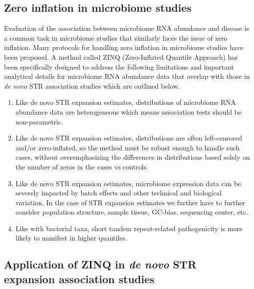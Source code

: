 \documentclass[unnumsec,webpdf,contemporary,large]{oup-authoring-template}%
\theoremstyle{thmstyleone}%
\theoremstyle{thmstyletwo}%
\theoremstyle{thmstylethree}%
\begin{document}
\subsection{Zero inflation in microbiome studies}\label{subsec1}

Evaluation of the association between microbiome RNA abundance and disease is a common task in
microbiome studies that similarly faces the issue of zero inflation. Many protocols for 
handling zero inflation in microbiome studies have been proposed. A method called ZINQ\cite{ling_powerful_2021}
(Zero-Inflated Quantile Approach) has been specifically designed to address the following limitations
and important analytical details for microbiome RNA abundance data that overlap with those in
\emph{de novo} STR association studies which are outlined below.

\begin{enumerate}
    \item Like de novo STR expansion estimates, distributions of microbiome RNA abundance data are heterogeneous which means association tests should be non-parametric.
    \item Like de novo STR expansion estimates, distributions are often left-censored and/or zero-inflated, so the method must be robust enough to handle such cases, without overemphasizing the differences in distributions based solely on the number of zeros in the cases vs controls.
    \item Like de novo STR expansion estimates, microbiome expression data can be severely impacted by batch effects and other technical and biological variation. In the case of STR expansion estimates we further have to further consider population structure, sample tissue, GC-bias, sequencing center, etc.
    \item Like with bacterial taxa, short tandem repeat-related pathogenicity is more likely to manifest in higher quantiles.
  \end{enumerate}

\subsection{Application of ZINQ in \textit{de novo} STR expansion association studies}\label{subsec1}
\end{document}
